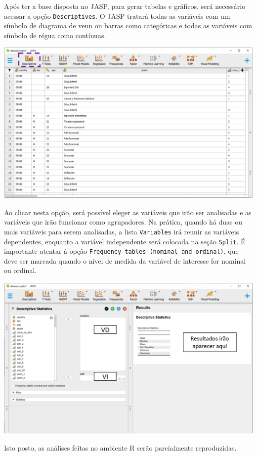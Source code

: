 \documentclass[
]{book}
\begin{document}
Após ter a base disposta no JASP, para gerar tabelas e gráficos, será necessário acessar a opção \texttt{Descriptives}. O JASP tratará todas as variáveis com um símbolo de diagrama de venn ou barras como categóricas e todas as variáveis com símbolo de régua como contínuas.

\includegraphics{./img/cap_desc_jasp_descritivo.png}

Ao clicar nesta opção, será possível eleger as variáveis que irão ser analisadas e as variáveis que irão funcionar como agrupadores. Na prática, quando há duas ou mais variáveis para serem analisadas, a lista \texttt{Variables} irá reunir as variáveis dependentes, enquanto a variável independente será colocada na seção \texttt{Split}. É importante atentar à opção \texttt{Frequency\ tables\ (nominal\ and\ ordinal)}, que deve ser marcada quando o nível de medida da variável de interesse for nominal ou ordinal.

\includegraphics{./img/cap_desc_jasp_descritivo2.png}

Isto posto, as análises feitas no ambiente R serão parcialmente reproduzidas.
\end{document}
